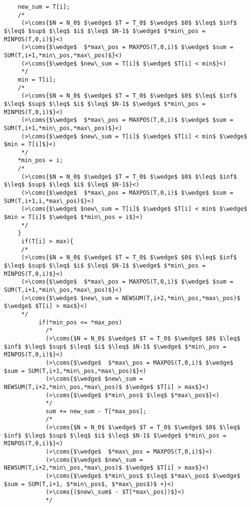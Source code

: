 \begin{lstlisting}
    new_sum = T[i];
    /*
     (>\coms{$N = N_0$ $\wedge$ $T = T_0$ $\wedge$ $0$ $\leq$ $inf$ $\leq$ $sup$ $\leq$ $i$ $\leq$ $N-1$ $\wedge$ $*min\_pos = MINPOS(T,0,i)$}<)
     (>\coms{$\wedge$  $*max\_pos = MAXPOS(T,0,i)$ $\wedge$ $sum = SUM(T,i+1,*min\_pos,*max\_pos)$}<)
     (>\coms{$\wedge$ $new\_sum = T[i]$ $\wedge$ $T[i] < min$}<)
     */
    min = T[i];
    /*
     (>\coms{$N = N_0$ $\wedge$ $T = T_0$ $\wedge$ $0$ $\leq$ $inf$ $\leq$ $sup$ $\leq$ $i$ $\leq$ $N-1$ $\wedge$ $*min\_pos = MINPOS(T,0,i)$}<)
     (>\coms{$\wedge$  $*max\_pos = MAXPOS(T,0,i)$ $\wedge$ $sum = SUM(T,i+1,*min\_pos,*max\_pos)$}<)
     (>\coms{$\wedge$ $new\_sum = T[i]$ $\wedge$ $T[i] < min$ $\wedge$ $min = T[i]$}<)
     */
    *min_pos = i;
    /*
     (>\coms{$N = N_0$ $\wedge$ $T = T_0$ $\wedge$ $0$ $\leq$ $inf$ $\leq$ $sup$ $\leq$ $i$ $\leq$ $N-1$}<)
     (>\coms{$\wedge$  $*max\_pos = MAXPOS(T,0,i)$ $\wedge$ $sum = SUM(T,i+1,i,*max\_pos)$}<)
     (>\coms{$\wedge$ $new\_sum = T[i]$ $\wedge$ $T[i] < min$ $\wedge$ $min = T[i]$ $\wedge$ $*min\_pos = i$}<)
     */
    }
     if(T[i] > max){
     /*
     (>\coms{$N = N_0$ $\wedge$ $T = T_0$ $\wedge$ $0$ $\leq$ $inf$ $\leq$ $sup$ $\leq$ $i$ $\leq$ $N-1$ $\wedge$ $*min\_pos = MINPOS(T,0,i)$}<)
     (>\coms{$\wedge$  $*max\_pos = MAXPOS(T,0,i)$ $\wedge$ $sum = SUM(T,i+1,*min\_pos,*max\_pos)$}<)
     (>\coms{$\wedge$ $new\_sum = NEWSUM(T,i+2,*min\_pos,*max\_pos)$ $\wedge$ $T[i] > max$}<)
     */
          if(*min_pos <= *max_pos)
            /*
            (>\coms{$N = N_0$ $\wedge$ $T = T_0$ $\wedge$ $0$ $\leq$ $inf$ $\leq$ $sup$ $\leq$ $i$ $\leq$ $N-1$ $\wedge$ $*min\_pos = MINPOS(T,0,i)$}<)
            (>\coms{$\wedge$  $*max\_pos = MAXPOS(T,0,i)$ $\wedge$ $sum = SUM(T,i+1,*min\_pos,*max\_pos)$}<)
            (>\coms{$\wedge$ $new\_sum = NEWSUM(T,i+2,*min\_pos,*max\_pos)$ $\wedge$ $T[i] > max$}<)
            (>\coms{$\wedge$ $*min\_pos$ $\leq$ $*max\_pos$}<)
            */
            sum += new_sum - T[*max_pos];
            /*
            (>\coms{$N = N_0$ $\wedge$ $T = T_0$ $\wedge$ $0$ $\leq$ $inf$ $\leq$ $sup$ $\leq$ $i$ $\leq$ $N-1$ $\wedge$ $*min\_pos = MINPOS(T,0,i)$}<)
            (>\coms{$\wedge$  $*max\_pos = MAXPOS(T,0,i)$}<)
            (>\coms{$\wedge$ $new\_sum = NEWSUM(T,i+2,*min\_pos,*max\_pos)$ $\wedge$ $T[i] > max$}<)
            (>\coms{$\wedge$ $*min\_pos$ $\leq$ $*max\_pos$ $\wedge$ $sum = SUM(T,i+1, $*min\_pos$, $*max\_pos$)$ +}<)
            (>\coms{($new\_sum$ - $T[*max\_pos])$}<)
            */


\end{lstlisting}
